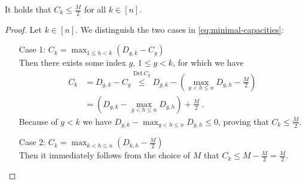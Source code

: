 \begin{lemma}
	\label{lemma:capacities-bounded}
	It holds that $C_k \leq \frac{M}{2}$ for all $k \in [n]$.
\end{lemma}
\begin{proof}
	Let $k \in [n]$.
	We distinguish the two cases in \cref{eq:minimal-capacities}:
	\begin{enumerate}[align=left]
		\item[Case 1: $C_k = \max_{1 \leq h < k}(D_{g, k} - C_g)$]{\mbox{}\\
			Then there exists some index $g$, $1 \leq g < k$, for which we have
			\begin{align}
				C_k &= D_{g, k} - C_g 
				\stackrel{\mathrm{Def. } C_g}{\leq} D_{g, k} - \left(\max_{g < h \leq n} D_{g,h} - \frac{M}{2}\right)\\
				&= (D_{g, k} - \max_{g < h \leq n} D_{g, h}) + \frac{M}{2} \ .
			\end{align}
			Because of $g < k$ we have $D_{g, k} - \max_{g < h \leq n} D_{g, h} \leq 0$, proving that $C_k \leq \frac{M}{2}$.
		}
		\item[Case 2: $C_k = \max_{k < h \leq n}(D_{k, h} - \frac{M}{2})$]{\mbox{}\\
			Then it immediately follows from the choice of $M$ that $C_k \leq M - \frac{M}{2} = \frac{M}{2}$.
		}
	\end{enumerate}
\end{proof}


